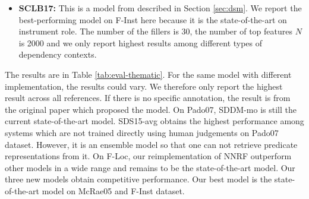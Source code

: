 \documentclass[a4paper]{article}
\begin{document}
\begin{itemize}
  \item \textbf{SCLB17: } This is a model from \citet{santus2017measuring} described in Section \ref{sec:dsm}. We report the  best-performing model on F-Inst here because it is the state-of-the-art on instrument role. The number of the fillers is 30, the number of top features $N$ is 2000 and we only report highest results among different types of dependency contexts. 
\end{itemize}

The results are in Table \ref{tab:eval-thematic}. For the same model with different implementation, the results could vary. We therefore only report the highest result across all references. If there is no specific annotation, the result is from the original paper which proposed the model. On Pado07, SDDM-mo is still the current state-of-the-art model. SDS15-avg obtains the highest performance among systems which are not trained directly using human judgements on Pado07 dataset. However, it is an ensemble model so that one can not retrieve predicate representations from it. On F-Loc, our reimplementation of NNRF outperform other models in a wide range and remains to be the state-of-the-art model. Our three new models obtain competitive performance. Our best model is the state-of-the-art model on McRae05 and F-Inst dataset. 
\end{document}
